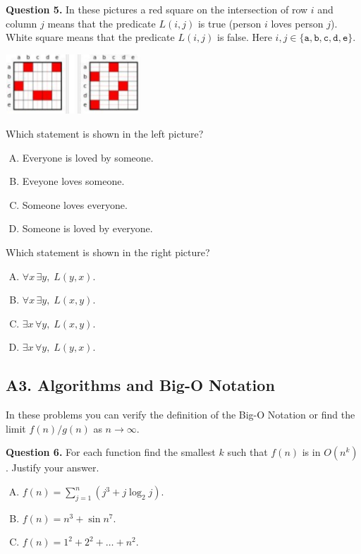 \documentclass[jou]{apa6}
\begin{document}
\vspace{6pt}
{\bf Question 5.} 
In these pictures a red square on the intersection 
of row $i$ and column $j$ 
means that the predicate $L(i,j)$ is true (person $i$ 
loves person $j$). White square means that the predicate $L(i,j)$
is false. Here 
$i,j \in \{ \mathtt{a},\mathtt{b},\mathtt{c},\mathtt{d},\mathtt{e} \}$. 
\begin{center}
\includegraphics[width=2in]{midterm/predicate-grid.png}
\end{center}
Which statement is shown in the left picture?
\begin{enumerate}[(A)]
\item Everyone is loved by someone.
\item Eveyone loves someone.
\item Someone loves everyone.
\item Someone is loved by everyone.
\end{enumerate}
Which statement is shown in the right picture?
\begin{enumerate}[(A)]
\item $\forall x\, \exists y,\;L(y,x)$. 
\item $\forall x\, \exists y,\;L(x,y)$. 
\item $\exists x\, \forall y,\;L(x,y)$. 
\item $\exists x\, \forall y,\;L(y,x)$. 
\end{enumerate}




\subsection{A3. Algorithms and Big-O Notation}

In these problems you can verify the definition of the Big-O Notation 
or find the limit $f(n)/g(n)$ as $n \rightarrow \infty$. 

{\bf Question 6.} For each function find the smallest
$k$ such that $f(n)$ is in $O(n^k)$. Justify your answer.
\begin{enumerate}[(A)]
\item $f(n) = \sum_{j=1}^{n} (j^3 + j \log_2 j)$. 
\item $f(n) = n^3 + \sin n^7$. 
\item $f(n) = 1^2 + 2^2 + \ldots + n^2$.
\end{enumerate}
\end{document}
